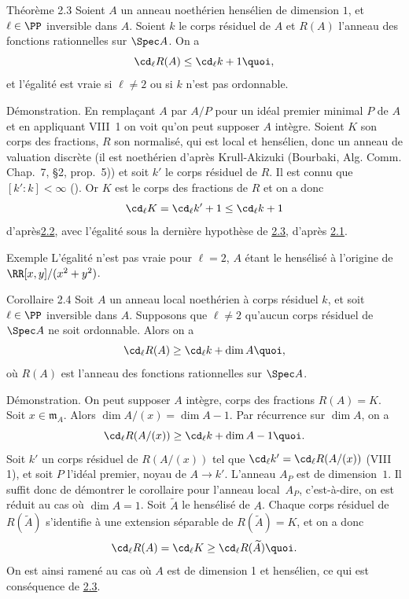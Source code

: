 \documentclass[10pt]{../fichiers-configuration-latex/smfart}
\begin{document}
\begin{enonce*}{Théorème 2.3}
Soient $A$ un anneau noethérien hensélien de dimension $1$, et
$\ell\in \PP$ inversible dans $A$. Soient $k$ le
corps résiduel de $A$ et $R(A)$ l'anneau des fonctions rationnelles
sur $\Spec A$. On a
$$
\cd_{\ell}R(A)\leq \cd_{\ell}k+1{\quoi},
$$
et l'égalité est vraie si $\ell\neq 2$ ou si $k$ n'est pas ordonnable.
\end{enonce*}

Démonstration. En remplaçant $A$ par $A/P$ pour un idéal premier
minimal $P$ de $A$ et en appliquant VIII 1 %
on voit qu'on peut supposer $A$ intègre. Soient $K$ son corps des fractions, $R$ son
normalisé, qui est local et hensélien, donc un anneau de valuation
discrète (il est noethérien d'après Krull-Akizuki (Bourbaki,
Alg. Comm. Chap.~7, \S 2, prop.~5)) et soit $k'$ le corps résiduel de
$R$. Il est connu que $[k':k]<\infty$ (\loccit). Or $K$ est le corps
des fractions de $R$ et on a donc
$$
\cd_{\ell}K=\cd_{\ell}k'+1\leq \cd_{\ell}k+1
$$
d'après\pageoriginale \hyperref[X.thm2.2]{2.2}, avec l'égalité sous la dernière hypothèse
de \hyperref[X.thm2.3]{2.3}, d'après \hyperref[X.thm2.1]{2.1}.

\begin{enonce*}[remark]{Exemple}
L'égalité n'est pas vraie pour $\ell=2$, $A$ étant le hensélisé à
l'origine de $\RR[x,y]/(x^2+y^2)$.
\end{enonce*}

\begin{enonce*}{Corollaire 2.4}
Soit $A$ un anneau local noethérien à corps résiduel $k$, et soit
$\ell\in \PP$ inversible dans $A$. Supposons que
$\ell\neq 2$  qu'aucun corps résiduel de $\Spec A$ ne soit
ordonnable. Alors on a
$$
\cd_{\ell}R(A)\geq \cd_{\ell}k+\dim A{\quoi},
$$
où $R(A)$ est l'anneau des fonctions rationnelles sur $\Spec A$.
\end{enonce*}

Démonstration. On peut supposer $A$ intègre,  corps des fractions
$R(A)=K$. Soit $x\in 𝔪_A$.
Alors $\dim A/(x)=\dim A-1$. Par récurrence sur $\dim A$, on a
$$
\cd_{\ell}R(A/(x))\geq \cd_{\ell}k+\dim A-1{\quoi}.
$$
Soit $k'$ un corps résiduel de $R(A/(x))$ tel que
$\cd_{\ell}k'=\cd_{\ell}R(A/(x))$ (\cf VIII 1), et soit $P$ %
l'idéal premier, noyau de $A\rightarrow k'$. L'anneau $A_P$ est de dimension $1$.
Il suffit donc de démontrer le corollaire pour l'anneau local $A_P$,
c'est-à-dire, on est réduit au cas où $\dim A=1$. Soit
$\widetilde{A}$ le hensélisé de $A$. Chaque corps résiduel de
$R(\widetilde{A})$ s'identifie à une extension séparable de
$R(\widetilde{A})=K$, et on a donc
$$
\cd_{\ell}R(A)=\cd_{\ell}K\geq \cd_{\ell}R(\widetilde{A}){\quoi}.
$$
On est ainsi ramené au cas où $A$ est de dimension 1 et hensélien, ce
qui est conséquence de \hyperref[X.thm2.3]{2.3}.
\end{document}
